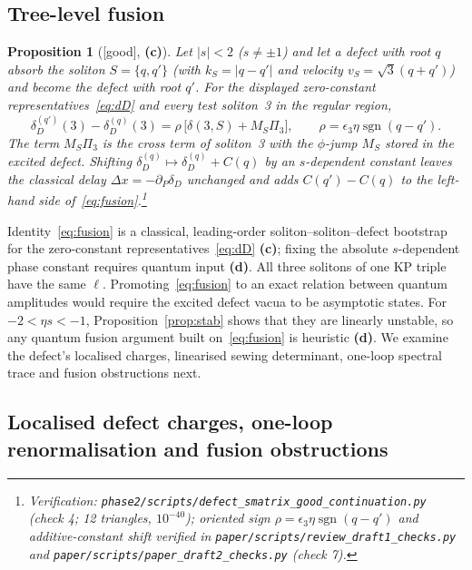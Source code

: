 \documentclass[11pt,a4paper]{article}
\newcommand{\lab}[1]{{\normalfont\sffamily\footnotesize\bfseries(#1)}}
\newcommand{\Lc}{\lab{c}}
\newcommand{\Ld}{\lab{d}}
\newcommand{\eqtag}[2]{{\normalfont\sffamily\footnotesize\textcolor{#1}{[#2]}}}
\newcommand{\Good}{\eqtag{teal!70!black}{good}}
\newcommand{\scr}[1]{\nolinkurl{#1}}
\newcommand{\chk}[1]{\footnote{\raggedright Verification: #1.}}
\newcommand{\sgn}{\operatorname{sgn}}
\newtheorem{proposition}{Proposition}[section]
\theoremstyle{remark}
\begin{document}
\subsection{Tree-level fusion}

\begin{proposition}[\Good, \Lc]\label{prop:fusion}
Let $|s|<2$ ($s\neq\pm1$) and let a defect with root $q$ absorb the soliton $S=\{q,q'\}$ (with $k_S=|q-q'|$ and velocity $v_S=\sqrt3(q+q')$) and become the defect with root $q'$. For the displayed zero-constant representatives~\eqref{eq:dD} and every test soliton~3 in the regular region,
\begin{equation}\label{eq:fusion}
\delta_D^{(q')}(3)-\delta_D^{(q)}(3)=\rho\,\big[\delta(3,S)+M_S\Pi_3\big],\qquad\rho=\epsilon_3\eta\sgn(q-q') .
\end{equation}
The term $M_S\Pi_3$ is the cross term of soliton~3 with the $\phi$-jump $M_S$ stored in the excited defect. Shifting $\delta_D^{(q)}\mapsto\delta_D^{(q)}+C(q)$ by an $s$-dependent constant leaves the classical delay $\Delta x=-\partial_P\delta_D$ unchanged and adds $C(q')-C(q)$ to the left-hand side of~\eqref{eq:fusion}.\chk{\scr{phase2/scripts/defect_smatrix_good_continuation.py} (check 4; 12 triangles, $10^{-40}$); oriented sign $\rho=\epsilon_3\eta\sgn(q-q')$ and additive-constant shift verified in \scr{paper/scripts/review_draft1_checks.py} and \scr{paper/scripts/paper_draft2_checks.py} (check 7)}
\end{proposition}

Identity~\eqref{eq:fusion} is a classical, leading-order soliton--soliton--defect bootstrap for the zero-constant representatives~\eqref{eq:dD} \Lc; fixing the absolute $s$-dependent phase constant requires quantum input \Ld. All three solitons of one KP triple have the same $\ell$. Promoting~\eqref{eq:fusion} to an exact relation between quantum amplitudes would require the excited defect vacua to be asymptotic states. For $-2<\eta s<-1$, Proposition~\ref{prop:stab} shows that they are linearly unstable, so any quantum fusion argument built on~\eqref{eq:fusion} is heuristic \Ld. We examine the defect's localised charges, linearised sewing determinant, one-loop spectral trace and fusion obstructions next.

\subsection{Localised defect charges, one-loop renormalisation and fusion obstructions}\label{sec:defq}
\end{document}
